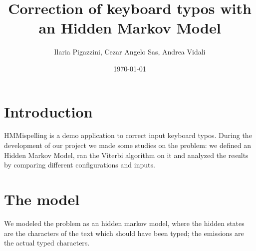 \documentclass[12pt]{article}
\title{Correction of keyboard typos with an Hidden Markov Model} %
\author{Ilaria Pigazzini, Cezar Angelo Sas, Andrea Vidali} %
\date{\today} %
\begin{document}
\maketitle %



\newpage
\tableofcontents \newpage
\section{Introduction}
HMMispelling is a demo application to correct input keyboard typos. During the
development of our project we made some studies on the problem: we defined an
Hidden Markov Model, ran the Viterbi algorithm on it and analyzed the
results by comparing different configurations and inputs.
% 


\section{The model}
We modeled the problem as an hidden markov model, where the hidden states are
the characters of the text which should have been typed; the emissions are the
actual typed characters.
\end{document}
